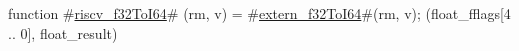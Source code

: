 function #\hyperref[sailRISCVzriscvzyf32ToI64]{riscv\_f32ToI64}# (rm, v) = {
  #\hyperref[sailRISCVzexternzyf32ToI64]{extern\_f32ToI64}#(rm, v);
  (float_fflags[4 .. 0], float_result)
}
